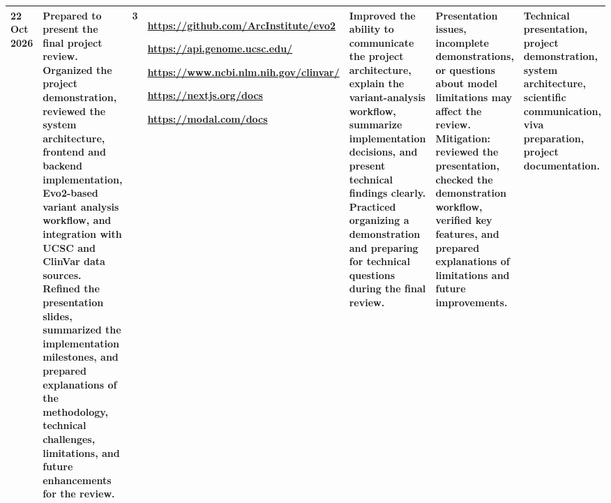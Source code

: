 \documentclass[8pt,a4paper]{article}
\begin{document}
\begin{longtable}{|
    D{1.25cm}|
    D{4.10cm}|
    D{0.70cm}|
    D{2.90cm}|
    D{2.90cm}|
    D{3.00cm}|
    D{2.95cm}|
}
22 Oct 2026 &
Prepared to present the final project review. Organized the project demonstration, reviewed the system architecture, frontend and backend implementation, Evo2-based variant analysis workflow, and integration with UCSC and ClinVar data sources. Refined the presentation slides, summarized the implementation milestones, and prepared explanations of the methodology, technical challenges, limitations, and future enhancements for the review. &
3 &
\url{https://github.com/ArcInstitute/evo2}
\par
\url{https://api.genome.ucsc.edu/}
\par
\url{https://www.ncbi.nlm.nih.gov/clinvar/}
\par
\url{https://nextjs.org/docs}
\par
\url{https://modal.com/docs}
&
Improved the ability to communicate the project architecture, explain the variant-analysis workflow, summarize implementation decisions, and present technical findings clearly. Practiced organizing a demonstration and preparing for technical questions during the final review. &
Presentation issues, incomplete demonstrations, or questions about model limitations may affect the review. Mitigation: reviewed the presentation, checked the demonstration workflow, verified key features, and prepared explanations of limitations and future improvements. &
Technical presentation, project demonstration, system architecture, scientific communication, viva preparation, project documentation. \\
\hline

\end{longtable}
\end{document}
